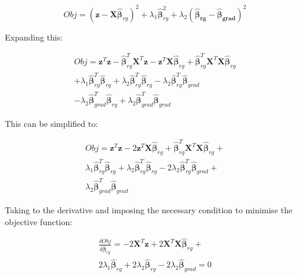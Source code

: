 \documentclass{article}
\begin{document}
\begin{equation}
	\label{rg_opt3}
	Obj = (\mathbf{z} -\mathbf{X}  \hat{\boldsymbol{\beta}}_{rg})^2 + \lambda_1 \hat{\boldsymbol{\beta}}_{rg}^2 + \lambda_2 (\boldsymbol{\hat{\beta}_{rg}} - \boldsymbol{\hat{\beta}_{grad}})^2
\end{equation}

Expanding this:

\begin{equation}
	\label{rg_opt_expand}
	\begin{split}
	Obj = \mathbf{z}^T \mathbf{z} -  \hat{\boldsymbol{\beta}}_{rg}^T \mathbf{X}^T \mathbf{z} - \mathbf{z}^T \mathbf{X}  \hat{\boldsymbol{\beta}}_{rg} + \hat{\boldsymbol{\beta}}_{rg}^T \mathbf{X}^T \mathbf{X} \hat{\boldsymbol{\beta}}_{rg}  
	\\
	+ \lambda_1 \hat{\boldsymbol{\beta}}_{rg}^T \hat{\boldsymbol{\beta}}_{rg} + \lambda_2 \hat{\boldsymbol{\beta}}_{rg}^T \hat{\boldsymbol{\beta}}_{rg} - \lambda_2  \hat{\boldsymbol{\beta}}_{rg}^T \hat{\boldsymbol{\beta}}_{grad} 
	\\
	- \lambda_2  \hat{\boldsymbol{\beta}}_{grad}^T \hat{\boldsymbol{\beta}}_{rg} + \lambda_2  \hat{\boldsymbol{\beta}}_{grad}^T \hat{\boldsymbol{\beta}}_{grad}
\end{split}
\end{equation}

This can be simplified to:

\begin{equation}
	\label{rg_opt_simp}
	\begin{split}
		Obj = \mathbf{z}^T \mathbf{z}  - 2 \mathbf{z}^T \mathbf{X}  \hat{\boldsymbol{\beta}}_{rg} + \hat{\boldsymbol{\beta}}_{rg}^T \mathbf{X}^T \mathbf{X} \hat{\boldsymbol{\beta}}_{rg} + 
		\\
		 \lambda_1 \hat{\boldsymbol{\beta}}_{rg}^T \hat{\boldsymbol{\beta}}_{rg} + \lambda_2 \hat{\boldsymbol{\beta}}_{rg}^T \hat{\boldsymbol{\beta}}_{rg} - 2 \lambda_2  \hat{\boldsymbol{\beta}}_{rg}^T \hat{\boldsymbol{\beta}}_{grad} + 
		 \\
		 \lambda_2  \hat{\boldsymbol{\beta}}_{grad}^T \hat{\boldsymbol{\beta}}_{grad}
	\end{split}
\end{equation}

Taking to the derivative and imposing the necessary condition to minimise the objective function:

\begin{equation}
	\label{obj_derivative}
	\begin{split}
		\frac{\delta Obj}{\delta \hat{\boldsymbol{\beta}}_{rg}} =  -2\mathbf{X}^T \mathbf{z} + 2 \mathbf{X}^T \mathbf{X} \hat{\boldsymbol{\beta}}_{rg} + 
		\\
		2  \lambda_1 \hat{\boldsymbol{\beta}}_{rg} +
		2 \lambda_2 \hat{\boldsymbol{\beta}}_{rg} - 2 \lambda_2  \hat{\boldsymbol{\beta}}_{grad} = 0
	\end{split}
\end{equation}
\end{document}
